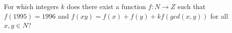 For which integers $k$ does there exist a function $f : N \to Z$ such that
$f(1995) =1996$ and $f(xy) = f(x)+ f(y)+k f(gcd(x,y))$ for all $x,y \in N$?